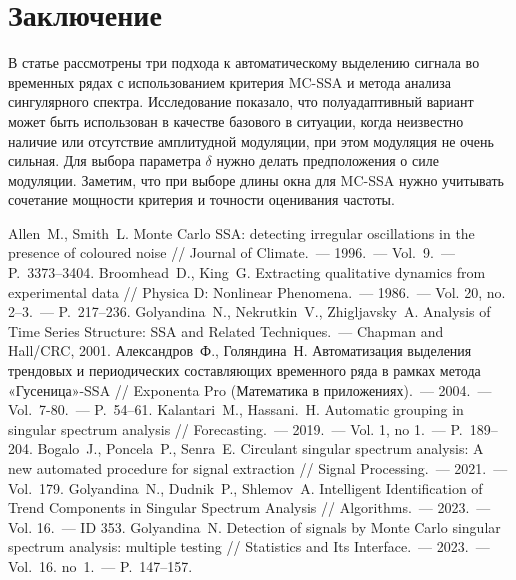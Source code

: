 \documentclass{math-mech-sci}
\begin{document}
\section*{Заключение}
В статье рассмотрены три подхода к автоматическому выделению сигнала во временных рядах с использованием критерия MC-SSA и метода анализа сингулярного спектра.
Исследование показало, что полуадаптивный вариант может быть использован в качестве базового в ситуации, когда неизвестно наличие или отсутствие амплитудной модуляции, при этом модуляция не очень сильная. Для выбора параметра $\delta$ нужно делать предположения о силе модуляции. Заметим, что при выборе длины окна для MC-SSA нужно учитывать сочетание мощности критерия  и точности оценивания частоты.

\begin{thebibliography}{8}
     Allen~M., Smith~L. Monte Carlo SSA: detecting irregular oscillations in the presence of coloured noise // Journal of Climate.~--- 1996.~--- Vol.~9.~--- P.~3373--3404.
     Broomhead~D., King~G. Extracting qualitative dynamics from experimental data // Physica D: Nonlinear Phenomena.~--- 1986.~--- Vol. 20, no. 2–3.~--- P.~217--236.
     Golyandina~N., Nekrutkin~V., Zhigljavsky~A. Analysis of Time Series Structure: SSA and Related Techniques.~--- Chapman and Hall/CRC, 2001.
     Александров~Ф., Голяндина~Н.
    Автоматизация выделения трендовых и периодических составляющих временного ряда в рамках метода «Гусеница»-SSA // Exponenta Pro (Математика в приложениях).~--- 2004.~--- Vol.~7-80.~--- P.~54--61.
     Kalantari~M., Hassani.~H. Automatic grouping in singular spectrum analysis // Forecasting.~--- 2019.~--- Vol. 1, no 1.~--- P.~189--204.
     Bogalo~J., Poncela~P., Senra~E. Circulant singular spectrum analysis: A new automated procedure for signal extraction // Signal Processing.~--- 2021.~--- Vol.~179.
     Golyandina~N., Dudnik~P., Shlemov~A. Intelligent Identification of Trend Components in Singular Spectrum Analysis // Algorithms.~--- 2023.~--- Vol. 16.~--- ID 353.
     Golyandina~N. Detection of signals by Monte Carlo singular spectrum analysis: multiple testing // Statistics and Its Interface.~--- 2023.~--- Vol.~16. no~1.~--- P.~147--157.
\end{thebibliography}
\end{document}
